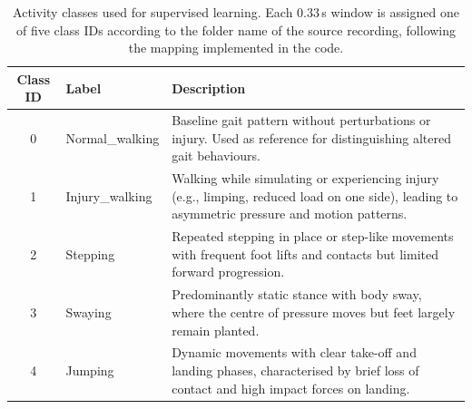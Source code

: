 \begin{table}[t]
    \centering
    \small
    \begin{tabularx}{\linewidth}{|c|l|X|}
      \hline
      \textbf{Class ID} & \textbf{Label} & \textbf{Description} \\
      \hline
      0 & Normal\_walking & Baseline gait pattern without perturbations or injury. Used as reference for distinguishing altered gait behaviours. \\
      \hline
      1 & Injury\_walking & Walking while simulating or experiencing injury (e.g., limping, reduced load on one side), leading to asymmetric pressure and motion patterns. \\
      \hline
      2 & Stepping & Repeated stepping in place or step-like movements with frequent foot lifts and contacts but limited forward progression. \\
      \hline
      3 & Swaying & Predominantly static stance with body sway, where the centre of pressure moves but feet largely remain planted. \\
      \hline
      4 & Jumping & Dynamic movements with clear take-off and landing phases, characterised by brief loss of contact and high impact forces on landing. \\
      \hline
    \end{tabularx}
    \caption{Activity classes used for supervised learning. Each 0.33\,s window is assigned one of five class IDs according to the folder name of the source recording, following the mapping implemented in the code.}
    \label{tab:activity-classes}
  \end{table}

